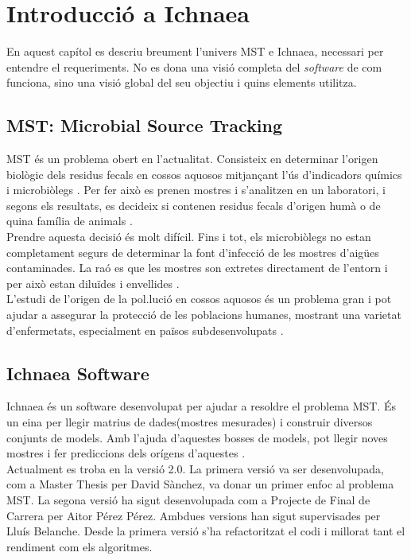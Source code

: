 \chapter{Introducció a Ichnaea}
\label{cha:background}
En aquest cap\'{i}tol es descriu breument l'univers MST e Ichnaea, necessari per entendre el requeriments. No es dona una visi\'{o} completa del \textit{software} de com funciona, sino una visi\'{o} global del seu objectiu i quins elements utilitza. 

\section{MST: Microbial Source Tracking}
\label{sec:mst}
MST \'{e}s un problema obert en l'actualitat. Consisteix en determinar l'origen biol\`{o}gic dels residus fecals en cossos aquosos mitjan\c{c}ant l'\'{u}s d'indicadors químics i microbiòlegs \cite{paper}. Per fer això es prenen mostres i s'analitzen en un laboratori, i segons els resultats, es decideix si contenen residus fecals d'origen humà o de quina família de animals \cite{pfc}.\\

Prendre aquesta decisió \'{e}s molt difícil. Fins i tot, els microbiòlegs no estan completament segurs de determinar la font d'infecció de les mostres d'aigües contaminades. La raó es que les mostres son extretes directament de l'entorn i per això estan diluïdes i envellides \cite{pfc}.\\

L'estudi de l'origen de la pol.luci\'{o} en cossos aquosos \'{e}s un problema gran i pot ajudar a assegurar la protecció de les poblacions humanes, mostrant una varietat d'enfermetats, especialment en països subdesenvolupats \cite{pfc}.\\

\section{Ichnaea Software}
Ichnaea \'{e}s un software desenvolupat per ajudar a resoldre el problema MST. \'{E}s un eina per llegir matrius de dades(mostres mesurades) i construir diversos conjunts de models. Amb l'ajuda d'aquestes bosses de models, pot llegir noves mostres i fer prediccions dels orígens d'aquestes \cite{pfc}.\\
 
Actualment es troba en la versi\'{o} 2.0. La primera versi\'{o} va ser desenvolupada, com a Master Thesis per David Sànchez, va donar un primer enfoc al problema MST. La segona versi\'{o} ha sigut desenvolupada com a Projecte de Final de Carrera per Aitor P\'{e}rez P\'{e}rez. Ambdues versions han sigut supervisades per Llu\'{i}s Belanche. Desde la primera versi\'{o} s'ha refactoritzat el codi i millorat tant el rendiment com els algoritmes.\\


